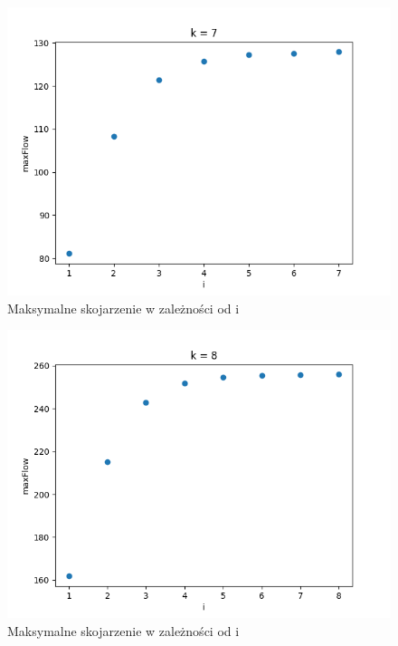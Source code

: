 \documentclass{report}
\begin{document}
\begin{figure}[H]
    \centering
    \includegraphics[scale=0.55]{../ex2/plots/k7.png}
    \caption{Maksymalne skojarzenie w zależności od i}
\end{figure}
\begin{figure}[H]
    \centering
    \includegraphics[scale=0.55]{../ex2/plots/k8.png}
    \caption{Maksymalne skojarzenie w zależności od i}
\end{figure}
\end{document}

